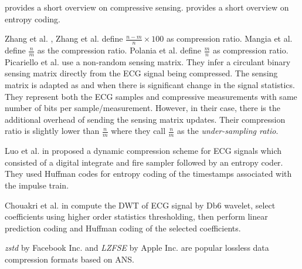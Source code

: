  provides a short overview on
compressive sensing.
 provides a short overview on
entropy coding.

Zhang et al. \cite{zhang2012compressed},
Zhang et al. \cite{zhang2021csnet} define
$\frac{n - m}{n} \times 100$ as compression ratio. 
Mangia et al. \cite{mangia2020deep} define $\frac{n}{m}$
as the compression ratio.
Polania et al. \cite{polania2018compressed} define
$\frac{m}{n}$ as compression ratio.
Picariello et al. \cite{picariello2021novel} use
a non-random sensing matrix.
They infer a circulant binary sensing matrix
directly from the ECG signal being compressed.
The sensing matrix is adapted as and when
there is significant change in the signal
statistics.
They represent both the ECG samples and
compressive measurements with same number of
bits per sample/measurement. However,
in their case, there is the additional
overhead of sending the sensing matrix updates.
Their compression ratio is slightly lower than
$\frac{n}{m}$ where they call $\frac{n}{m}$ as
the \emph{under-sampling ratio}.

Luo et al. in \cite{luo2014dynamic} proposed a dynamic
compression scheme for ECG signals which consisted
of a digital integrate and fire sampler followed
by an entropy coder. They used Huffman codes for
entropy coding of the timestamps associated with
the impulse train.

Chouakri et al. in \cite{chouakri2013wavelet} compute
the DWT of ECG signal by Db6 wavelet, select coefficients
using higher order statistics thresholding, then perform
linear prediction coding and Huffman coding of the selected
coefficients.  

\emph{zstd} by Facebook Inc. \cite{zstd}
and \emph{LZFSE} by Apple Inc. are popular lossless
data compression formats based on ANS.
